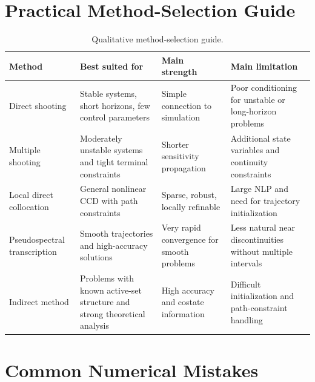 \documentclass[11pt]{article}
\begin{document}
\section{Practical Method-Selection Guide}

\begin{table}[H]
\centering
\caption{Qualitative method-selection guide.}
\begin{tabular}{>{\raggedright\arraybackslash}p{2.7cm} >{\raggedright\arraybackslash}p{3.6cm} >{\raggedright\arraybackslash}p{3.5cm} >{\raggedright\arraybackslash}p{3.3cm}}
\toprule
Method & Best suited for & Main strength & Main limitation \\
\midrule
Direct shooting & Stable systems, short horizons, few control parameters & Simple connection to simulation & Poor conditioning for unstable or long-horizon problems \\
Multiple shooting & Moderately unstable systems and tight terminal constraints & Shorter sensitivity propagation & Additional state variables and continuity constraints \\
Local direct collocation & General nonlinear CCD with path constraints & Sparse, robust, locally refinable & Large NLP and need for trajectory initialization \\
Pseudospectral transcription & Smooth trajectories and high-accuracy solutions & Very rapid convergence for smooth problems & Less natural near discontinuities without multiple intervals \\
Indirect method & Problems with known active-set structure and strong theoretical analysis & High accuracy and costate information & Difficult initialization and path-constraint handling \\
\bottomrule
\end{tabular}
\end{table}

\section{Common Numerical Mistakes}
\end{document}
